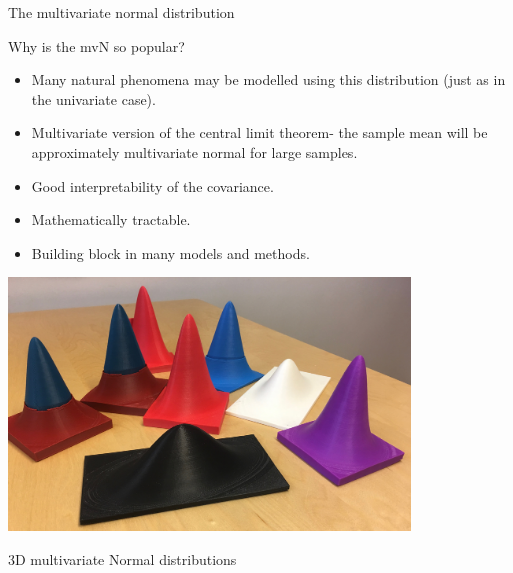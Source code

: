 \documentclass[
  ignorenonframetext,
]{beamer}
\providecommand{\tightlist}{%
  \setlength{\itemsep}{0pt}\setlength{\parskip}{0pt}}
\begin{document}
\begin{frame}
\end{frame}

\begin{frame}{The multivariate normal distribution}
\protect\hypertarget{the-multivariate-normal-distribution}{}
\vspace{2mm}

Why is the mvN so popular?

\begin{itemize}
\tightlist
\item
  Many natural phenomena may be modelled using this distribution (just
  as in the univariate case).
\item
  Multivariate version of the central limit theorem- the sample mean
  will be approximately multivariate normal for large samples.
\item
  Good interpretability of the covariance.
\item
  Mathematically tractable.
\item
  Building block in many models and methods.
\end{itemize}
\end{frame}

\begin{frame}
\centering

\includegraphics[width=0.8\textwidth,height=\textheight]{mvN.jpeg}

3D multivariate Normal distributions
\end{frame}
\end{document}
